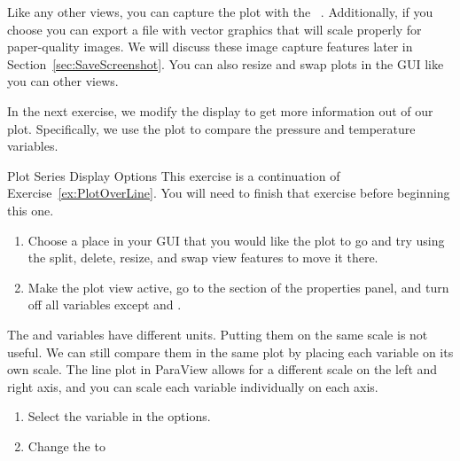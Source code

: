 Like any other views, you can capture the plot with the  \ra
{}~. Additionally, if you
choose  \ra {} you can export a file with
vector graphics that will scale properly for paper-quality images.  We will
discuss these image capture features later in
Section~\ref{sec:SaveScreenshot}.  You can also resize and swap plots in
the GUI like you can other views.

In the next exercise, we modify the display to get more information out of
our plot.  Specifically, we use the plot to compare the pressure and
temperature variables.

\begin{exercise}{Plot Series Display Options}
  \label{ex:PlotSeriesDisplayOptions}%
  This exercise is a continuation of Exercise~\ref{ex:PlotOverLine}.  You
  will need to finish that exercise before beginning this one.

  \begin{enumerate}
  \item Choose a place in your GUI that you would like the plot to go and
    try using the split, delete, resize, and swap view features to move it
    there.
  \item Make the plot view active, go to the  section of the
    properties panel, and turn off all variables except  and
    .
    \savecounter
  \end{enumerate}

  The  and  variables have different units.  Putting
  them on the same scale is not useful.  We can still compare them in the
  same plot by placing each variable on its own scale.  The line plot in
  ParaView allows for a different scale on the left and right axis, and you
  can scale each variable individually on each axis.

  \begin{enumerate}
    \restorecounter
  \item Select the  variable in the  options.
  \item Change the  to 
  \end{enumerate}


\end{exercise}

